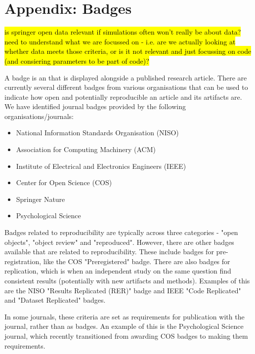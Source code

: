 \section{Appendix: Badges} \label{appendix:badges}

\hl{is springer open data relevant if simulations often won't really be about data? need to understand what we are focussed on - i.e. are we actually looking at whether data meets those criteria, or is it not relevant and just focussing on code (and consiering parameters to be part of code)?}

A badge is an that is displayed alongside a published research article. There are currently several different badges from various organisations that can be used to indicate how open and potentially reproducible an article and its artifacts are. We have identified journal badges provided by the following organisations/journals:
\begin{itemize}
    \item National Information Standards Organisation (NISO)
    \item Association for Computing Machinery (ACM)
    \item Institute of Electrical and Electronics Engineers (IEEE)
    \item Center for Open Science (COS)
    \item Springer Nature
    \item Psychological Science
\end{itemize}

Badges related to reproducibility are typically across three categories - "open objects", "object review" and "reproduced". However, there are other badges available that are related to reproducibility. These include badges for pre-registration, like the COS "Preregistered" badge.\autocite{blohowiak_badges_2023} There are also badges for replication, which is when an independent study on the same question find consistent results (potentially with new artifacts and methods). Examples of this are the NISO "Results Replicated (RER)" badge\autocite{niso_reproducibility_badging_and_definitions_working_group_reproducibility_2021} and IEEE "Code Replicated" and "Dataset Replicated" badges.\autocite{institute_of_electrical_and_electronics_engineers_ieee_about_nodate}

In some journals, these criteria are set as requirements for publication with the journal, rather than as badges. An example of this is the Psychological Science journal, which recently transitioned from awarding COS badges to making them requirements.\autocite{hardwicke_transparency_2023}

